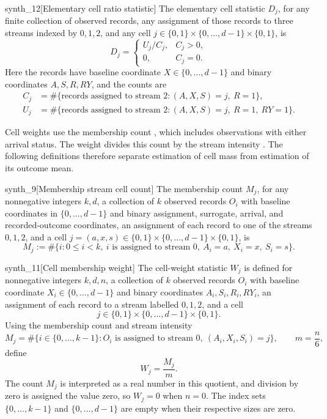 \documentclass[11pt]{article}
\begin{document}
\begin{definitionv}{synth_12}[Elementary cell ratio statistic]
The elementary cell statistic \(D_j\), for any finite collection of observed records, any assignment of those records to three streams indexed by \(0,1,2\), and any cell \(j\in\{0,1\}\times\{0,\ldots,d-1\}\times\{0,1\}\), is
\[
D_j=
\begin{cases}
U_j/C_j, & C_j>0,\\
0, & C_j=0.
\end{cases}
\]
Here the records have baseline coordinate \(X\in\{0,\ldots,d-1\}\) and binary coordinates \(A,S,R,RY\), and the counts are
\[
\begin{aligned}
C_j&=\#\{\text{records assigned to stream }2:
                 (A,X,S)=j,\ R=1\},\\
U_j&=\#\{\text{records assigned to stream }2:
                 (A,X,S)=j,\ R=1,\ RY=1\}.
\end{aligned}
\]
\end{definitionv}

Cell weights use the membership count , which includes observations with either arrival status. The weight  divides this count by the stream intensity . The following definitions therefore separate estimation of cell mass from estimation of its outcome mean.

\begin{definitionv}{synth_9}[Membership stream cell count]
The membership count \(M_j\), for any nonnegative integers \(k,d\), a collection of \(k\) observed records \(O_i\) with baseline coordinates in \(\{0,\ldots,d-1\}\) and binary assignment, surrogate, arrival, and recorded-outcome coordinates, an assignment of each record to one of the streams \(0,1,2\), and a cell \(j=(a,x,s)\in\{0,1\}\times\{0,\ldots,d-1\}\times\{0,1\}\), is
\[
M_j
:=
\#\bigl\{i:0\le i<k,\ 
i\text{ is assigned to stream }0,\ 
A_i=a,\ X_i=x,\ S_i=s\bigr\}.
\]
\end{definitionv}

\begin{definitionv}{synth_11}[Cell membership weight]
The cell-weight statistic \(W_j\) is defined for nonnegative integers \(k,d,n\), a collection of \(k\) observed records \(O_i\) with baseline coordinate \(X_i\in\{0,\ldots,d-1\}\) and binary coordinates \(A_i,S_i,R_i,RY_i\), an assignment of each record to a stream labelled \(0,1,2\), and a cell
\[
j\in\{0,1\}\times\{0,\ldots,d-1\}\times\{0,1\}.
\]
Using the membership count and stream intensity
\[
M_j=\#\{i\in\{0,\ldots,k-1\}: O_i\text{ is assigned to stream }0,\ (A_i,X_i,S_i)=j\},
\qquad
m=\frac{n}{6},
\]
define
\[
W_j=\frac{M_j}{m}.
\]
The count \(M_j\) is interpreted as a real number in this quotient, and division by zero is assigned the value zero, so \(W_j=0\) when \(n=0\). The index sets \(\{0,\ldots,k-1\}\) and \(\{0,\ldots,d-1\}\) are empty when their respective sizes are zero.
\end{definitionv}
\end{document}
